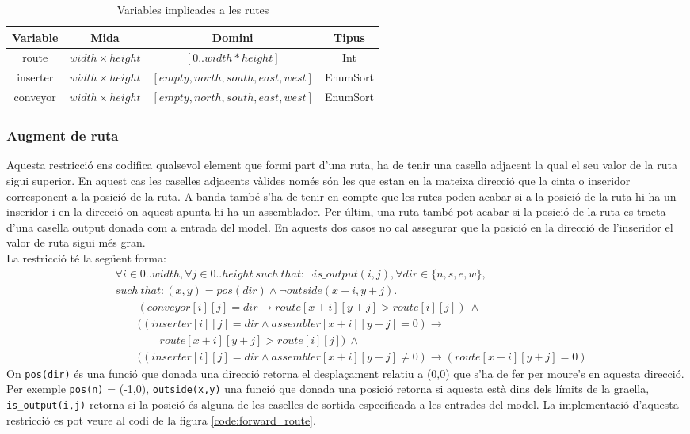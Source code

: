 \begin{table}[h]
    \centering
    \begin{tabular}{|c|c|c|c|}
    \hline
    \textbf{Variable} & \textbf{Mida} & \textbf{Domini} & \textbf{Tipus} \\
    \hline
    route & $width \times height$ & $[0..width*height]$ & Int\\
    \hline
    inserter & $width \times height$ & $[empty, north, south, east, west]$ & EnumSort\\
    \hline
    conveyor & $width \times height$ & $[empty, north, south, east, west]$ & EnumSort\\
    \hline
    \end{tabular}
    \caption{Variables implicades a les rutes}
    \label{route-variables}
\end{table}

\subsubsection{Augment de ruta}
Aquesta restricció ens codifica qualsevol element que formi part d'una ruta, ha de tenir una casella adjacent la qual el seu valor de la ruta sigui superior. En aquest cas les caselles adjacents vàlides només són les que estan en la mateixa direcció que la cinta o inseridor corresponent a la posició de la ruta. A banda també s'ha de tenir en compte que les rutes poden acabar si a la posició de la ruta hi ha un inseridor i en la direcció on aquest apunta hi ha un assemblador. Per últim, una ruta també pot acabar si la posició de la ruta es tracta d'una casella output donada com a entrada del model. En aquests dos casos no cal assegurar que la posició en la direcció de l'inseridor el valor de ruta sigui més gran.\\
La restricció té la següent forma:
\begin{align*}
    &\forall i \in 0..width, \forall j \in 0..height \ such \ that: \lnot is\_output(i,j), \forall dir \in\{n, s, e, w\},\\
    &such \ that: (x,y)=pos(dir) \land \lnot outside(x+i, y+j).\\
    &\qquad (conveyor[i][j]=dir\rightarrow route[x+i][y+j]>route[i][j]) \ \land\\
    &\qquad ((inserter[i][j]=dir\land assembler[x+i][y+j]=0)\rightarrow \\
    &\qquad \qquad route[x+i][y+j]>route[i][j]) \ \land\\
    &\qquad ((inserter[i][j]=dir\land assembler[x+i][y+j]\neq0)\rightarrow(route[x+i][y+j]=0)
\end{align*}
On \lstinline{pos(dir)} és una funció que donada una direcció retorna el desplaçament relatiu a (0,0) que s'ha de fer per moure's en aquesta direcció. Per exemple \lstinline{pos(n)} = (-1,0), \lstinline{outside(x,y)} una funció que donada una posició retorna si aquesta està dins dels límits de la graella, \lstinline{is_output(i,j)} retorna si la posició és alguna de les caselles de sortida especificada a les entrades del model.
La implementació d'aquesta restricció es pot veure al codi de la figura \ref{code:forward_route}.

